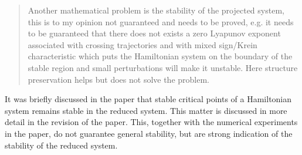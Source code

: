 \documentclass[a4paper]{article}
\newcommand{\breview}{\begin{quotation}\begin{bf}\noindent}
\newcommand{\ereview}{\end{bf}\end{quotation}}
\begin{document}
\breview
Another mathematical problem is the stability of the projected system, this is to my opinion not guaranteed and needs to be proved, e.g. it needs to be guaranteed that there does not exists a zero Lyapunov exponent associated with crossing trajectories and with mixed sign/Krein characteristic which puts the Hamiltonian system on the boundary of the stable region and small perturbations will make it unstable. Here structure preservation helps but does not solve the problem.
\ereview

It was briefly discussed in the paper that stable critical points of a Hamiltonian system remains stable in the reduced system. This matter is discussed in more detail in the revision of the paper. This, together with the numerical experiments in the paper, do not guarantee general stability, but are strong indication of the stability of the reduced system.
\end{document}
